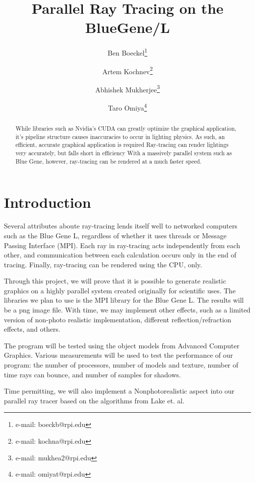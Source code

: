 \documentclass{acmsiggraph}
\title{Parallel Ray Tracing on the BlueGene/L}
\author{%
Ben Boeckel\thanks{e-mail: boeckb@rpi.edu} %
\and Artem Kochnev\thanks{e-mail: kochna@rpi.edu} %
\and Abhishek Mukherjee\thanks{e-mail: mukhea2@rpi.edu} %
\and Taro Omiya\thanks{e-mail: omiyat@rpi.edu}}
\begin{document}
\maketitle

\begin{abstract}
While libraries such as Nvidia's CUDA can greatly optimize the graphical
application, it's pipeline structure causes inaccuracies to occur in lighting
physics.  As such, an efficient, accurate graphical application is required
Ray-tracing can render lightings very accurately, but falls short in efficiency
With a massively parallel system such as Blue Gene, however, ray-tracing can be
rendered at a much faster speed.
\end{abstract}
\keywordlist

\section{Introduction}
Several attributes aboute ray-tracing lends itself well to networked computers
such as the Blue Gene L, regardless of whether it uses threads or Message
Passing Interface (MPI).  Each ray in ray-tracing acts independently from each
other, and communication between each calculation occurs only in the end of
tracing.  Finally, ray-tracing can be rendered using the CPU, only.

Through this project, we will prove that it is possible to generate realistic
graphics on a highly parallel system created originally for scientific uses.
The libraries we plan to use is the MPI library for the Blue Gene L.
The results will be a png image file.  With time, we may implement other
effects, such as a limited version of non-photo realistic implementation,
different reflection/refraction effects, and others.

The program will be tested using the object models from Advanced Computer
Graphics.  Various measurements will be used to test the performance of our
program: the number of processors, number of models and texture, number of time
rays can bounce, and number of samples for shadows.

Time permitting, we will also implement a Nonphotorealistic aspect into our
parallel ray tracer based on the algorithms from Lake et.
al.
\end{document}
